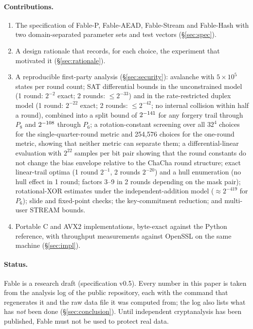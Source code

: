 \documentclass{iacrtrans}
\newcommand{\Fable}{\textsf{Fable}\xspace}
\newcommand{\FableP}{\textsf{Fable-P}\xspace}
\newcommand{\FableAEAD}{\textsf{Fable-AEAD}\xspace}
\newcommand{\FableStream}{\textsf{Fable-Stream}\xspace}
\newcommand{\FableHash}{\textsf{Fable-Hash}\xspace}
\newcommand{\ChaCha}{\textsf{ChaCha}\xspace}
\newcommand{\PP}[1]{P_{#1}}
\newcommand{\WrateTwo}{42}   %
\newcommand{\WuncTwo}{33}    %
\newcommand{\WlinTwo}{20}    %
\newcommand{\BoundEight}{\the\numexpr\WrateTwo+3*\WuncTwo\relax}   %
\newcommand{\BoundSix}{\the\numexpr\WrateTwo+2*\WuncTwo\relax}     %
\begin{document}
\paragraph{Contributions.}
\begin{enumerate}
\item The specification of \FableP, \FableAEAD, \FableStream and \FableHash with two domain-separated parameter sets and test vectors (\S\ref{sec:spec}).
\item A design rationale that records, for each choice, the experiment that motivated it (\S\ref{sec:rationale}).
\item A reproducible first-party analysis (\S\ref{sec:security}): avalanche with $5\times10^5$ states per round count; SAT differential bounds in the unconstrained model (1 round: $2^{-2}$ exact; 2 rounds: $\leq 2^{-\WuncTwo}$) and in the rate-restricted duplex model (1 round: $2^{-22}$ exact; 2 rounds: $\leq 2^{-\WrateTwo}$; no internal collision within half a round), combined into a split bound of $2^{-\BoundEight}$ for any forgery trail through $\PP{8}$ and $2^{-\BoundSix}$ through $\PP{6}$; a rotation-constant screening over all $32^4$ choices for the single-quarter-round metric and 254,576 choices for the one-round metric, showing that neither metric can separate them; a differential-linear evaluation with $2^{22}$ samples per bit pair showing that the round constants do not change the bias envelope relative to the \ChaCha round structure; exact linear-trail optima (1 round $2^{-1}$, 2 rounds $2^{-\WlinTwo}$) and a hull enumeration (no hull effect in 1 round; factors 3--9 in 2 rounds depending on the mask pair); rotational-XOR estimates under the independent-addition model ($\approx 2^{-419}$ for $\PP{6}$); slide and fixed-point checks; the key-commitment reduction; and multi-user STREAM bounds.
\item Portable C and AVX2 implementations, byte-exact against the Python reference, with throughput measurements against OpenSSL on the same machine (\S\ref{sec:impl}).
\end{enumerate}

\paragraph{Status.}
\Fable is a research draft (specification v0.5). Every number in this paper is taken from the analysis log of the public repository, each with the command that regenerates it and the raw data file it was computed from; the log also lists what has \emph{not} been done (\S\ref{sec:conclusion}). Until independent cryptanalysis has been published, \Fable must not be used to protect real data.
\end{document}
